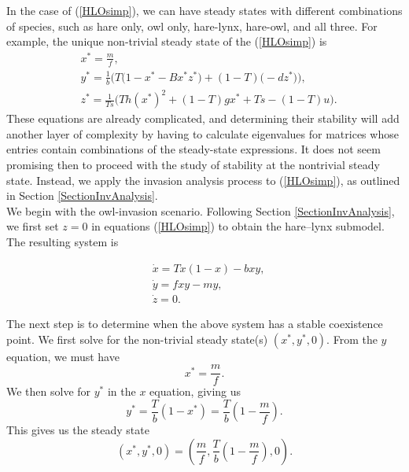 \documentclass[12pt]{UOthesis}
\theoremstyle{remarkstyle}
\begin{document}
In the case of (\ref{HLOsimp}), we can have steady states with different combinations of species, such as hare only, owl only, hare-lynx, hare-owl, and all three. For example, the unique non-trivial steady state of the (\ref{HLOsimp}) is
\begin{equation}
	\begin{split}
		&x^*=\frac{m}{f},\\
		&y^*=\frac{1}{b}\Big(T\big(1-x^*-Bx^*z^*\big)+(1-T)\big(-dz^*\big)\Big),\\
		&z^*=\frac{1}{Ts}\Big(Th(x^*)^2+(1-T)gx^*+Ts-(1-T)u\Big).
	\end{split}
	\label{HLOsimpCoexPt}
\end{equation}
These equations are already complicated, and determining their stability will add another layer of complexity by having to calculate eigenvalues for matrices whose entries contain combinations of the steady-state expressions. It does not seem promising then to proceed with the study of stability at the nontrivial steady state. Instead, we apply the invasion analysis process to (\ref{HLOsimp}), as outlined in Section \ref{SectionInvAnalysis}.\\

We begin with the owl-invasion scenario. Following Section \ref{SectionInvAnalysis}, we first set $z=0$ in equations (\ref{HLOsimp}) to obtain the hare--lynx submodel. The resulting system is

\begin{equation}
	\begin{split}
		&\dot{x}=Tx(1-x)-b xy,\\
		&\dot{y}=fxy-my,\\
		&\dot{z}=0.
	\end{split}
	\label{HLOsimpz=0}
\end{equation}

The next step is to determine when the above system has a stable coexistence point. We first solve for the non-trivial steady state(s) $(x^*,y^*,0)$. From the $y$ equation, we must have
$$x^*=\frac{m}{f}.$$
We then solve for $y^*$ in the $x$ equation, giving us
\begin{equation*}
	y^*=\frac{T}{b}(1-x^*)=\frac{T}{b}\left(1-\frac{m}{f}\right).
\end{equation*}
This gives us the steady state 
\begin{equation}
	(x^*,y^*,0)=\left(\frac{m}{f}, \frac{T}{b}\left(1-\frac{m}{f}\right),0\right).
	\label{HLOsimpz=0SteadyState}
\end{equation}
\end{document}
